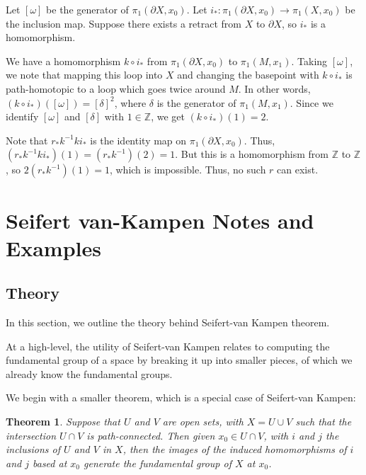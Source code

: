 \documentclass[10pt, oneside]{amsart}
\newtheorem{thm}{Theorem}
\begin{document}
    Let $[\omega]$ be the generator of $\pi_1(\partial X, x_0)$. Let $i_{*} : \pi_1(\partial X, x_0) \rightarrow \pi_1(X, x_0)$ be the inclusion map. Suppose there exists a retract from $X$ to $\partial X$,
    so $i_{*}$ is a homomorphism.
    \newline

    We have a homomorphism $k \circ i_{*}$ from $\pi_1(\partial X, x_0)$ to $\pi_1(M, x_1)$. Taking
    $[\omega]$, we note that mapping this loop into $X$ and changing the basepoint with $k \circ i_{*}$ is path-homotopic to a loop which goes twice around $M$.
    In other words, $(k \circ i_{*})([\omega]) = [\delta]^2$, where $\delta$ is the generator of $\pi_1(M, x_1)$. Since we identify $[\omega]$ and $[\delta]$ with $1 \in \mathbb{Z}$, we get $(k \circ i_{*})(1) = 2$.
    \newline

    Note that $r_{*} k^{-1} k i_{*}$ is the identity map on $\pi_1(\partial X, x_0)$. Thus, $(r_{*} k^{-1} k i_{*})(1) = (r_{*} k^{-1})(2) = 1$. But this is a homomorphism from $\mathbb{Z}$ to $\mathbb{Z}$, so $2 (r_{*} k^{-1})(1) = 1$,
    which is impossible. Thus, no such $r$ can exist.

    \hrulefill

    \section{Seifert van-Kampen Notes and Examples}

    \subsection{Theory}

    In this section, we outline the theory behind Seifert-van Kampen theorem.
    \newline

    At a high-level, the utility of Seifert-van Kampen relates to computing the fundamental group of a space by breaking it up into smaller pieces, of which we already know the
    fundamental groups.
    \newline

    We begin with a smaller theorem, which is a special case of Seifert-van Kampen:

    \begin{thm}
      Suppose that $U$ and $V$ are open sets, with $X = U \cup V$ such that the intersection $U \cap V$ is path-connected. Then given $x_0 \in U \cap V$, with $i$ and $j$ the
      inclusions of $U$ and $V$ in $X$, then the images of the induced homomorphisms of $i$ and $j$ based at $x_0$ generate the fundamental group of $X$ at $x_0$.
    \end{thm}
\end{document}
